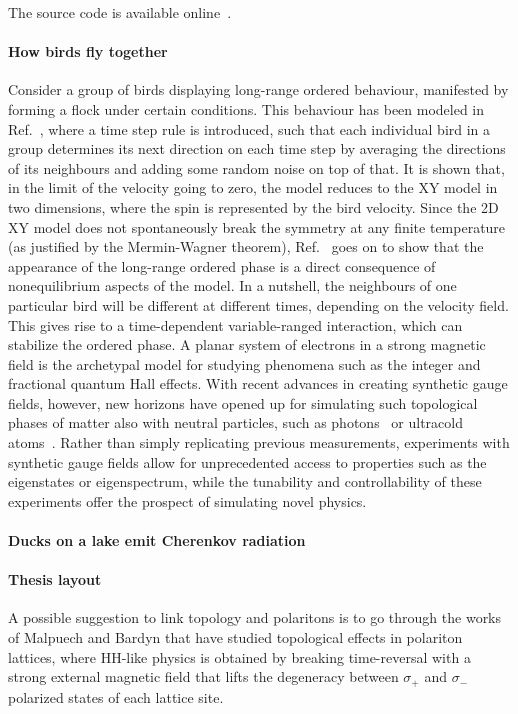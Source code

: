 The source code is available online~\cite{SourceCode}.

\paragraph{How birds fly together}
Consider a group of birds displaying long-range ordered behaviour,
manifested by forming a flock under certain conditions. This behaviour
has been modeled in Ref.~\cite{Toner1995}, where a time step rule is
introduced, such that each individual bird in a group determines its
next direction on each time step by averaging the directions of its
neighbours and adding some random noise on top of that. It is shown
that, in the limit of the velocity going to zero, the model reduces to
the XY model in two dimensions, where the spin is represented by the
bird velocity. Since the 2D XY model does not spontaneously break the
symmetry at any finite temperature (as justified by the Mermin-Wagner
theorem), Ref.~\cite{Toner1995} goes on to show that the appearance of
the long-range ordered phase is a direct consequence of nonequilibrium
aspects of the model. In a nutshell, the neighbours of one particular
bird will be different at different times, depending on the velocity
field. This gives rise to a time-dependent variable-ranged
interaction, which can stabilize the ordered phase.
%
A planar system of electrons in a strong magnetic field is the
archetypal model for studying phenomena such as the integer and
fractional quantum Hall effects. With recent advances in creating
synthetic gauge fields, however, new horizons have opened up for
simulating such topological phases of matter also with neutral
particles, such as photons~\cite{hafezi2014synthetic} or ultracold
atoms~\cite{dalibardrmp2011, goldman_repprog_2014,
Goldman_arxiv_2015}.  Rather than simply replicating previous
measurements, experiments with synthetic gauge fields allow for
unprecedented access to properties such as the eigenstates or
eigenspectrum, while the tunability and controllability of these
experiments offer the prospect of simulating novel physics.


\paragraph{Ducks on a lake emit Cherenkov radiation}

\paragraph{Thesis layout}

A possible suggestion to link topology and polaritons is to go through
the works of Malpuech and Bardyn that have studied topological effects
in polariton lattices, where HH-like physics is obtained by breaking
time-reversal with a strong external magnetic field that lifts the
degeneracy between $\sigma_+$ and $\sigma_-$ polarized states of each
lattice site.




